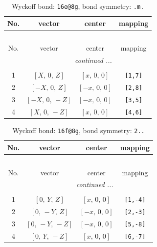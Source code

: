 \documentclass[fleqn,8pt]{jsarticle}
\begin{document}
\renewcommand{\arraystretch}{1.2}
\begin{longtable}{cccc}
\caption{Wyckoff bond: {\tt 16e@8g}, bond symmetry: {\tt .m.}}
 \\
 \hline \hline
No. & vector & center & mapping \\ \hline \endfirsthead

\multicolumn{3}{l}{\tablename\ \thetable{}} \\
 \hline \hline
No. & vector & center & mapping \\ \hline \endhead

 \hline \hline
\multicolumn{3}{r}{\footnotesize\it continued ...} \\ \endfoot

 \hline \hline
\multicolumn{3}{r}{} \\ \endlastfoot

1 & $\left[ X,\, 0,\, Z \right]$ & $\left[ x,\, 0,\, 0 \right]$ & {\tt [1,7]} \\ \hline
2 & $\left[ - X,\, 0,\, Z \right]$ & $\left[ - x,\, 0,\, 0 \right]$ & {\tt [2,8]} \\ \hline
3 & $\left[ - X,\, 0,\, - Z \right]$ & $\left[ - x,\, 0,\, 0 \right]$ & {\tt [3,5]} \\ \hline
4 & $\left[ X,\, 0,\, - Z \right]$ & $\left[ x,\, 0,\, 0 \right]$ & {\tt [4,6]} \\
\end{longtable}
\renewcommand{\arraystretch}{1.2}
\begin{longtable}{cccc}
\caption{Wyckoff bond: {\tt 16f@8g}, bond symmetry: {\tt 2..}}
 \\
 \hline \hline
No. & vector & center & mapping \\ \hline \endfirsthead

\multicolumn{3}{l}{\tablename\ \thetable{}} \\
 \hline \hline
No. & vector & center & mapping \\ \hline \endhead

 \hline \hline
\multicolumn{3}{r}{\footnotesize\it continued ...} \\ \endfoot

 \hline \hline
\multicolumn{3}{r}{} \\ \endlastfoot

1 & $\left[ 0,\, Y,\, Z \right]$ & $\left[ x,\, 0,\, 0 \right]$ & {\tt [1,-4]} \\ \hline
2 & $\left[ 0,\, - Y,\, Z \right]$ & $\left[ - x,\, 0,\, 0 \right]$ & {\tt [2,-3]} \\ \hline
3 & $\left[ 0,\, - Y,\, - Z \right]$ & $\left[ - x,\, 0,\, 0 \right]$ & {\tt [5,-8]} \\ \hline
4 & $\left[ 0,\, Y,\, - Z \right]$ & $\left[ x,\, 0,\, 0 \right]$ & {\tt [6,-7]} \\
\end{longtable}
\end{document}

